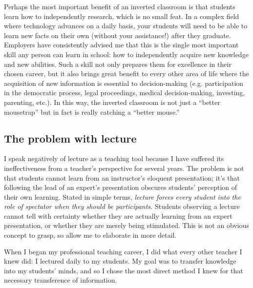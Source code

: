Perhaps the most important benefit of an inverted classroom is that students learn how to independently research, which is no small feat.  In a complex field where technology advances on a daily basis, your students will need to be able to learn new facts on their own (without your assistance!) after they graduate.  Employers have consistently advised me that this is the single most important skill any person can learn in school: how to independently acquire new knowledge and new abilities.  Such a skill not only prepares them for excellence in their chosen career, but it also brings great benefit to every other area of life where the acquisition of new information is essential to decision-making (e.g. participation in the democratic process, legal proceedings, medical decision-making, investing, parenting, etc.).  In this way, the inverted classroom is not just a ``better mousetrap'' but in fact is really catching a ``better mouse.''








\filbreak
\subsection{The problem with lecture}

I speak negatively of lecture as a teaching tool because I have suffered its ineffectiveness from a teacher's perspective for several years.  The problem is not that students cannot learn from an instructor's eloquent presentation; it's that following the lead of an expert's presentation obscures students' perception of their own learning.  Stated in simple terms, \textit{lecture forces every student into the role of spectator when they should be participants.}  Students observing a lecture cannot tell with certainty whether they are actually learning from an expert presentation, or whether they are merely being stimulated.  This is not an obvious concept to grasp, so allow me to elaborate in more detail.

\vskip 10pt

When I began my professional teaching career, I did what every other teacher I knew did: I lectured daily to my students.  My goal was to transfer knowledge into my students' minds, and so I chose the most direct method I knew for that necessary transference of information.  

